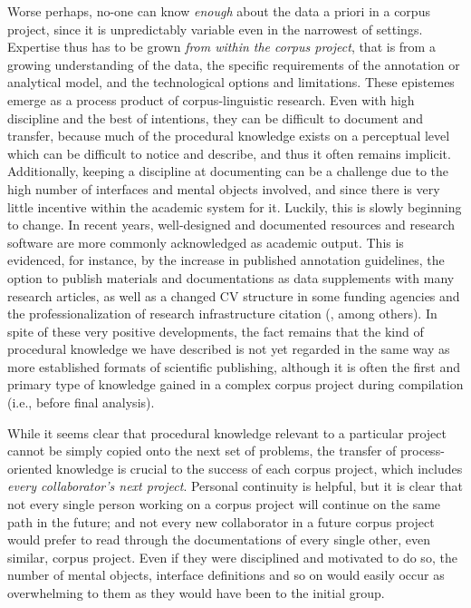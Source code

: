 \documentclass[output=paper,colorlinks,citecolor=brown]{langscibook}
\begin{document}
Worse perhaps, no-one can know \textit{enough} about the data a priori in a corpus project, since it is unpredictably variable even in the narrowest of settings. Expertise thus has to be grown \textit{from within the corpus project}, that is from a growing understanding of the data, the specific requirements of the annotation or analytical model, and the technological options and limitations. These epistemes emerge as a process product of corpus-linguistic research. Even with high discipline and the best of intentions, they can be difficult to document and transfer, because much of the procedural knowledge exists on a perceptual level which can be difficult to notice and describe, and thus it often remains implicit. Additionally, keeping a discipline at documenting can be a challenge due to the high number of interfaces and mental objects involved, and since there is very little incentive within the academic system for it. Luckily, this is slowly beginning to change. In recent years, well-designed and documented resources and research software are more commonly acknowledged as academic output. This is evidenced, for instance, by the increase in published annotation guidelines, the option to publish materials and documentations as data supplements with many research articles, as well as a changed CV structure in some funding agencies and the professionalization of research infrastructure citation (\cite{lavoie2012sustainable,anzt2020environment,schlauch2022hermes}, among others). In spite of these very positive developments, the fact remains that the kind of procedural knowledge we have described is not yet regarded in the same way as more established formats of scientific publishing, although it is often the first and primary type of knowledge gained in a complex corpus project during compilation (i.e., before final analysis).

While it seems clear that procedural knowledge relevant to a particular project cannot be simply copied onto the next set of problems, the transfer of process-oriented knowledge is crucial to the success of each corpus project, which includes \textit{every collaborator's next project}. Personal continuity is helpful, but it is clear that not every single person working on a corpus project will continue on the same path in the future; and not every new collaborator in a future corpus project would prefer to read through the documentations of every single other, even similar, corpus project. Even if they were disciplined and motivated to do so, the number of mental objects, interface definitions and so on would easily occur as overwhelming to them as they would have been to the initial group.
\end{document}
